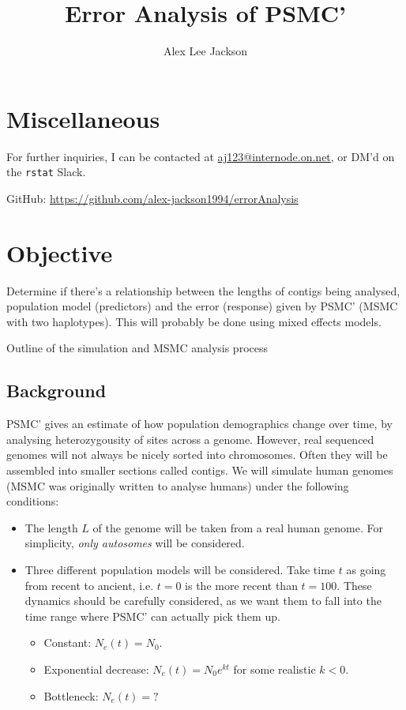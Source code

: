 \documentclass[11pt,a4paper]{article}
\title{Error Analysis of PSMC'}
\author{Alex Lee Jackson}
\begin{document}
\maketitle

%
\section{Miscellaneous}
For further inquiries, I can be contacted at \href{mailto:aj123@internode.on.net}{aj123@internode.on.net}, or DM'd on the \texttt{rstat} Slack.

GitHub: \url{https://github.com/alex-jackson1994/errorAnalysis}

\section{Objective}
Determine if there's a relationship between the lengths of contigs being analysed, population model (predictors) and the error (response) given by PSMC' (MSMC\cite{schiffels2014inferring} with two haplotypes). This will probably be done using mixed effects models.\\

\begin{algorithm}[H]
  \caption{Outline of the simulation and MSMC analysis process}\label{overall}
\end{algorithm}

\subsection{Background}
PSMC' gives an estimate of how population demographics change over time, by analysing heterozygousity of sites across a genome. However, real sequenced genomes will not always be nicely sorted into chromosomes. Often they will be assembled into smaller sections called contigs. We will simulate human genomes (MSMC was originally written to analyse humans) under the following conditions:
\begin{itemize}
\item The length $L$ of the genome will be taken from a real human genome. For simplicity, \emph{only autosomes} will be considered.
\item Three different population models will be considered. Take time $t$ as going from recent to ancient, i.e. $t=0$ is the more recent than $t=100$. These dynamics should be carefully considered, as we want them to fall into the time range where PSMC' can actually pick them up.
\begin{itemize}
\item Constant: $N_e(t)=N_0$.
\item Exponential decrease: $N_e(t)=N_0e^{kt}$ for some realistic $k<0$.
\item Bottleneck: $N_e(t)=?$
\end{itemize}
\end{itemize}
\end{document}
